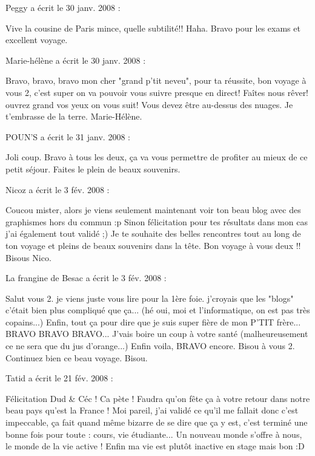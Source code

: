\medskip
Peggy a écrit le 30 janv. 2008 :
\begin{displayquote}
Vive la cousine de Paris mince, quelle subtilité!! Haha.
Bravo pour les exams et excellent voyage.
\end{displayquote}

\medskip
Marie-hélène a écrit le 30 janv. 2008 :
\begin{displayquote}
Bravo, bravo, bravo mon cher "grand p'tit neveu", pour ta réussite, bon voyage à vous 2, c'est super on va pouvoir vous suivre presque en direct! Faîtes nous rêver! ouvrez grand vos yeux on vous suit!
Vous devez être au-dessus des nuages.
Je t'embrasse de la terre.
Marie-Hélène.
\end{displayquote}

\medskip
POUN'S a écrit le 31 janv. 2008 :
\begin{displayquote}
Joli coup.
Bravo à tous les deux, ça va vous permettre de profiter au mieux de ce petit séjour. Faites le plein de beaux souvenirs.
\end{displayquote}

\medskip
Nicoz a écrit le 3 fév. 2008 :
\begin{displayquote}
Coucou mister,
alors je viens seulement maintenant voir ton beau blog avec des graphismes hors du commun :p
Sinon félicitation pour tes résultats dans mon cas j'ai également tout validé ;)
Je te souhaite des belles rencontres tout au long de ton voyage et pleins de beaux souvenirs dans la tête.
Bon voyage à vous deux !!
Bisous
Nico.
\end{displayquote}

\medskip
La frangine de Besac a écrit le 3 fév. 2008 :
\begin{displayquote}
Salut vous 2. je viens juste vous lire pour la 1ère foie. j'croyais que les "blogs" c'était bien plus compliqué que ça... (hé oui, moi et l'informatique, on est pas très copains...)
Enfin, tout ça pour dire que je suis super fière de mon P'TIT frère... BRAVO BRAVO BRAVO... J'vais boire un coup à votre santé (malheureusement ce ne sera que du jus d'orange...)
Enfin voila, BRAVO encore.
Bisou à vous 2. Continuez bien ce beau voyage.
Bisou.
\end{displayquote}

\medskip
Tatid a écrit le 21 fév. 2008 :
\begin{displayquote}
Félicitation Dud \& Céc ! Ca pète !
Faudra qu'on fête ça à votre retour dans notre beau pays qu'est la France !
Moi pareil, j'ai validé ce qu'il me fallait donc c'est impeccable, ça fait quand même bizarre de se dire que ça y est, c'est terminé une bonne fois pour toute : cours, vie étudiante... Un nouveau monde s'offre à nous, le monde de la vie active ! Enfin ma vie est plutôt inactive en stage mais bon :D
\end{displayquote}

\vfill
